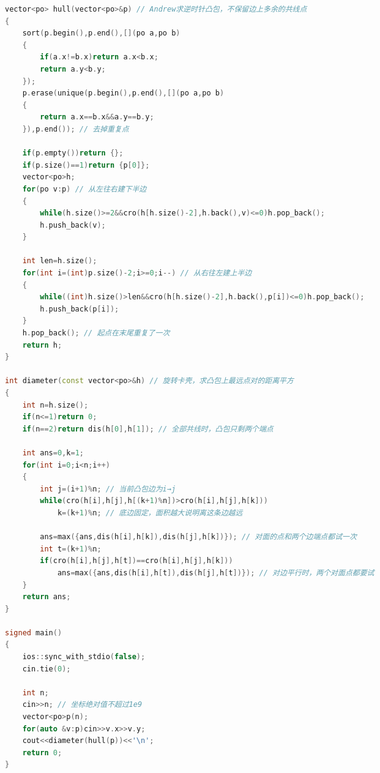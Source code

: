 \documentclass[10pt,landscape,a4paper]{article}
\begin{document}
\begin{multicols*}{3}
\begin{lstlisting}[language=C++]
vector<po> hull(vector<po>&p) // Andrew求逆时针凸包，不保留边上多余的共线点
{
    sort(p.begin(),p.end(),[](po a,po b)
    {
        if(a.x!=b.x)return a.x<b.x;
        return a.y<b.y;
    });
    p.erase(unique(p.begin(),p.end(),[](po a,po b)
    {
        return a.x==b.x&&a.y==b.y;
    }),p.end()); // 去掉重复点

    if(p.empty())return {};
    if(p.size()==1)return {p[0]};
    vector<po>h;
    for(po v:p) // 从左往右建下半边
    {
        while(h.size()>=2&&cro(h[h.size()-2],h.back(),v)<=0)h.pop_back();
        h.push_back(v);
    }

    int len=h.size();
    for(int i=(int)p.size()-2;i>=0;i--) // 从右往左建上半边
    {
        while((int)h.size()>len&&cro(h[h.size()-2],h.back(),p[i])<=0)h.pop_back();
        h.push_back(p[i]);
    }
    h.pop_back(); // 起点在末尾重复了一次
    return h;
}

int diameter(const vector<po>&h) // 旋转卡壳，求凸包上最远点对的距离平方
{
    int n=h.size();
    if(n<=1)return 0;
    if(n==2)return dis(h[0],h[1]); // 全部共线时，凸包只剩两个端点

    int ans=0,k=1;
    for(int i=0;i<n;i++)
    {
        int j=(i+1)%n; // 当前凸包边为i→j
        while(cro(h[i],h[j],h[(k+1)%n])>cro(h[i],h[j],h[k]))
            k=(k+1)%n; // 底边固定，面积越大说明离这条边越远

        ans=max({ans,dis(h[i],h[k]),dis(h[j],h[k])}); // 对面的点和两个边端点都试一次
        int t=(k+1)%n;
        if(cro(h[i],h[j],h[t])==cro(h[i],h[j],h[k]))
            ans=max({ans,dis(h[i],h[t]),dis(h[j],h[t])}); // 对边平行时，两个对面点都要试
    }
    return ans;
}

signed main()
{
    ios::sync_with_stdio(false);
    cin.tie(0);

    int n;
    cin>>n; // 坐标绝对值不超过1e9
    vector<po>p(n);
    for(auto &v:p)cin>>v.x>>v.y;
    cout<<diameter(hull(p))<<'\n';
    return 0;
}
\end{lstlisting}

\end{multicols*}
\end{document}
